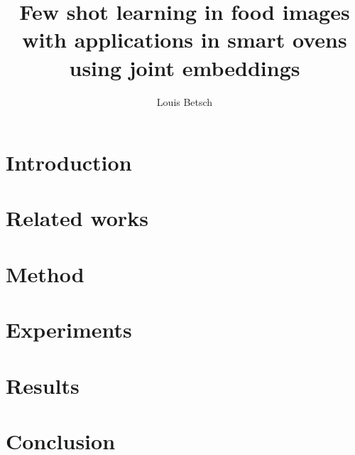 \documentclass[12pt]{article}
\title{Few shot learning in food images with applications in smart ovens using joint embeddings}
\author{Louis Betsch}
\begin{document}
\maketitle


\clearpage

\tableofcontents
\clearpage

\listoffigures
\clearpage

\listoftables
\clearpage

\printnoidxglossary[type=\acronymtype]
\clearpage

\section{Introduction}
\label{sec:introduction}


\section{Related works}
\label{sec:related_works}


\section{Method}
\label{sec:method}


\section{Experiments}
\label{sec:experiments}


\section{Results}
\label{sec:results}


\section{Conclusion}
\label{sec:conclusion}


\clearpage

\printbibliography
\end{document}
